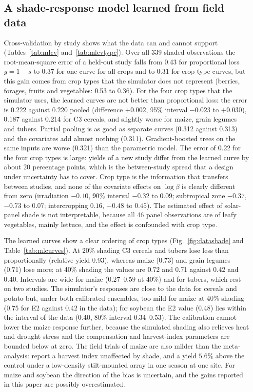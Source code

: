 

\subsection{A shade-response model learned from field data}\label{sec:mlresults}
Cross-validation by study shows what the data can and cannot support (Tables~\ref{tab:mlcv} and~\ref{tab:mlcvtype}). Over all 339 shaded observations the root-mean-square error of a held-out study falls from 0.43 for proportional loss $y=1-s$ to 0.37 for one curve for all crops and to 0.31 for crop-type curves, but this gain comes from crop types that the simulator does not represent (berries, forages, fruits and vegetables: 0.53 to 0.36). For the four crop types that the simulator uses, the learned curves are not better than proportional loss: the error is 0.222 against 0.220 pooled (difference $+0.002$, 95\% interval $-0.023$ to $+0.030$), 0.187 against 0.214 for C3 cereals, and slightly worse for maize, grain legumes and tubers. Partial pooling is as good as separate curves (0.312 against 0.313) and the covariates add almost nothing (0.311). Gradient-boosted trees on the same inputs are worse (0.321) than the parametric model. The error of 0.22 for the four crop types is large: yields of a new study differ from the learned curve by about 20 percentage points, which is the between-study spread that a design under uncertainty has to cover. Crop type is the information that transfers between studies, and none of the covariate effects on $\log\beta$ is clearly different from zero (irradiation $-0.10$, 90\% interval $-0.32$ to $0.09$; subtropical zone $-0.37$, $-0.73$ to $0.07$; intercropping $0.16$, $-0.48$ to $0.45$). The estimated effect of solar-panel shade is not interpretable, because all 46 panel observations are of leafy vegetables, mainly lettuce, and the effect is confounded with crop type.


The learned curves show a clear ordering of crop types (Fig.~\ref{fig:datashade} and Table~\ref{tab:mlcurves}). At 20\% shading C3 cereals and tubers lose less than proportionally (relative yield 0.93), whereas maize (0.73) and grain legumes (0.71) lose more; at 40\% shading the values are 0.72 and 0.71 against 0.42 and 0.40. Intervals are wide for maize ($0.27$--$0.59$ at 40\%) and for tubers, which rest on two studies. The simulator's responses are close to the data for cereals and potato but, under both calibrated ensembles, too mild for maize at 40\% shading (0.75 for E2 against 0.42 in the data); for soybean the E2 value (0.48) lies within the interval of the data (0.40, 80\% interval 0.34--0.53). The calibration cannot lower the maize response further, because the simulated shading also relieves heat and drought stress and the compensation and harvest-index parameters are bounded below at zero. The field trials of maize are also milder than the meta-analysis: \citet{ramosfuentes2023} report a harvest index unaffected by shade, and \citet{sekiyama2019} a yield $5.6$\% above the control under a low-density stilt-mounted array in one season at one site. For maize and soybean the direction of the bias is uncertain, and the gains reported in this paper are possibly overestimated.

